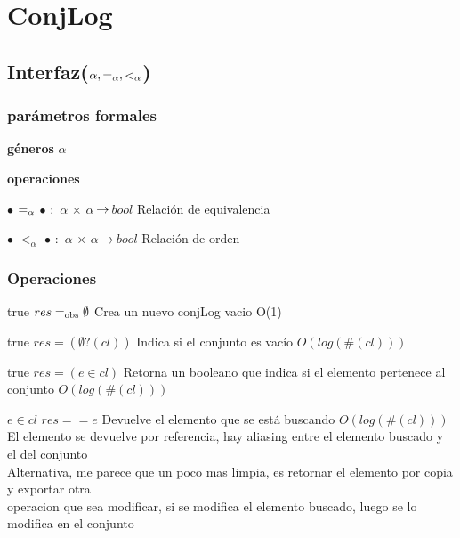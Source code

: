 \section{ConjLog}

\subsection{Interfaz($\alpha, \igsub{\alpha}, <_\alpha$)}

	\subsubsection{parámetros formales}
	\begin{description}[labelindent=1cm]
	\item[] \textbf{g\'eneros} $\alpha$
	\item[] \textbf{operaciones} 
			\begin{description}[labelindent=1cm] 
			\item[] $\bullet$ $\igsub{\alpha}$ $\bullet$ $:$ $\alpha$ $\times$ $\alpha$ $\!\rightarrow\!$ $bool$ \indent Relación de equivalencia
			\item[] $\bullet$ $<_\alpha$ $\bullet$ $:$ $\alpha$ $\times$ $\alpha$ $\!\rightarrow\!$ $bool$	\indent Relación de orden
			\end{description}
	\end{description}
	


\subsubsection*{Operaciones}

{true}
{$res =_{\mathrm{obs}} \emptyset$}
{Crea un nuevo conjLog vacio}
{O(1)}
{}

{true}
{$res = (\emptyset?(cl))$}
{Indica si el conjunto es vacío}
{$O(log(\#(cl)))$}
{}

{true}
{$res = (e \in cl)$}
{Retorna un booleano que indica si el elemento pertenece al conjunto}
{$O(log(\#(cl)))$}
{}

{$e \in cl$}
{$res == e$}
{Devuelve el elemento que se está buscando}
{$O(log(\#(cl)))$}
{El elemento se devuelve por referencia, hay aliasing entre el elemento buscado y el del conjunto\\
Alternativa, me parece que un poco mas limpia, es retornar el elemento por copia y exportar otra \\
operacion que sea modificar,  si se modifica el elemento buscado, luego se lo modifica en el conjunto}

